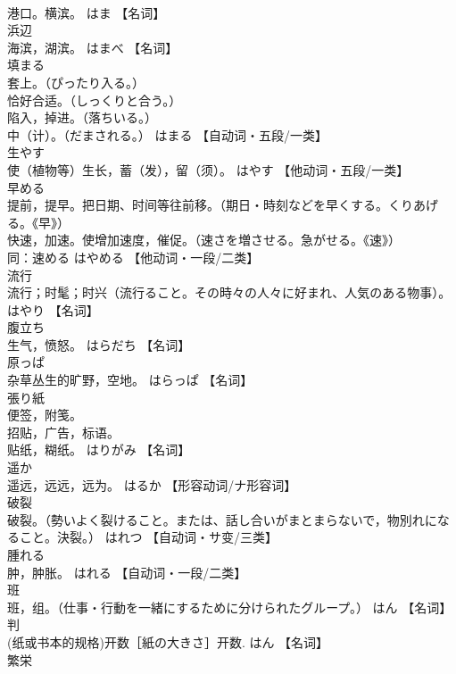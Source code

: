\documentclass[8pt]{extreport}
\begin{document}
\begin{CJK}{UTF8}{min}
\\	港口。横滨。	はま		【名词】
\\	浜辺	
\\	海滨，湖滨。	はまべ		【名词】
\\	填まる	
\\	套上。（ぴったり入る。） 
\\	恰好合适。（しっくりと合う。） 
\\	陷入，掉进。（落ちいる。） 
\\	中（计）。（だまされる。）	はまる		【自动词・五段/一类】
\\	生やす	
\\	使（植物等）生长，蓄（发），留（须）。	はやす		【他动词・五段/一类】
\\	早める	
\\	提前，提早。把日期、时间等往前移。（期日・時刻などを早くする。くりあげる。《早》） 
\\	快速，加速。使增加速度，催促。（速さを増させる。急がせる。《速》） 
\\	同：速める	はやめる		【他动词・一段/二类】
\\	流行	
\\	流行；时髦；时兴（流行ること。その時々の人々に好まれ、人気のある物事）。	はやり		【名词】
\\	腹立ち	
\\	生气，愤怒。	はらだち		【名词】
\\	原っぱ	
\\	杂草丛生的旷野，空地。	はらっぱ		【名词】
\\	張り紙	
\\	便签，附笺。 
\\	招贴，广告，标语。 
\\	贴纸，糊纸。	はりがみ		【名词】
\\	遥か	
\\	遥远，远远，远为。	はるか		【形容动词/ナ形容词】
\\	破裂	
\\	破裂。（勢いよく裂けること。または、話し合いがまとまらないで，物別れになること。決裂。）	はれつ		【自动词・サ变/三类】
\\	腫れる	
\\	肿，肿胀。	はれる		【自动词・一段/二类】
\\	班	
\\	班，组。（仕事・行動を一緒にするために分けられたグループ。）	はん		【名词】
\\	判	
\\	(纸或书本的规格)开数［紙の大きさ］开数.	はん		【名词】
\\	繁栄	

\end{CJK}
\end{document}
